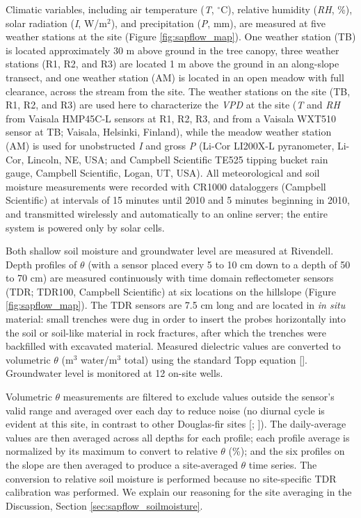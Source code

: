 Climatic variables, including air temperature (\textit{T}, $^{\circ}$C), relative humidity (\textit{RH}, \%), solar radiation (\textit{I}, W/m$^2$), and precipitation (\textit{P}, mm), are measured at five weather stations at the site (Figure \ref{fig:sapflow_map}).  One weather station (TB) is located approximately 30 m above ground in the tree canopy, three weather stations (R1, R2, and R3) are located 1 m above the ground in an along-slope transect, and one weather station (AM) is located in an open meadow with full clearance, across the stream from the site.  The weather stations on the site (TB, R1, R2, and R3) are used here to characterize the \textit{VPD} at the site (\textit{T} and \textit{RH} from Vaisala HMP45C-L sensors at R1, R2, R3, and from a Vaisala WXT510 sensor at TB; Vaisala, Helsinki, Finland), while the meadow weather station (AM) is used for unobstructed \textit{I} and gross \textit{P} (Li-Cor LI200X-L pyranometer, Li-Cor, Lincoln, NE, USA; and Campbell Scientific TE525 tipping bucket rain gauge, Campbell Scientific, Logan, UT, USA).  All meteorological and soil moisture measurements were recorded with CR1000 dataloggers (Campbell Scientific) at intervals of 15 minutes until 2010 and 5 minutes beginning in 2010, and transmitted wirelessly and automatically to an online server; the entire system is powered only by solar cells.

Both shallow soil moisture and groundwater level are measured at Rivendell.  Depth profiles of $\theta$ (with a sensor placed every 5 to 10 cm down to a depth of 50 to 70 cm) are measured continuously with time domain reflectometer sensors (TDR; TDR100, Campbell Scientific) at six locations on the hillslope (Figure \ref{fig:sapflow_map}).  The TDR sensors are 7.5 cm long and are located in \textit{in situ} material: small trenches were dug in order to insert the probes horizontally into the soil or soil-like material in rock fractures, after which the trenches were backfilled with excavated material.  Measured dielectric values are converted to volumetric $\theta$ (m$^3$ water/m$^3$ total) using the standard Topp equation [\cite{topp1980electromagnetic}].  Groundwater level is monitored at 12 on-site wells.

Volumetric $\theta$ measurements are filtered to exclude values outside the sensor's valid range and averaged over each day to reduce noise (no diurnal cycle is evident at this site, in contrast to other Douglas-fir sites [\cite{brooks2006}; \cite{Warren:2007ly}]).  The daily-average values are then averaged across all depths for each profile; each profile average is normalized by its maximum to convert to relative $\theta$ (\%); and the six profiles on the slope are then averaged to produce a site-averaged $\theta$ time series.  The conversion to relative soil moisture is performed because no site-specific TDR calibration was performed.  We explain our reasoning for the site averaging in the Discussion, Section \ref{sec:sapflow_soilmoisture}.

